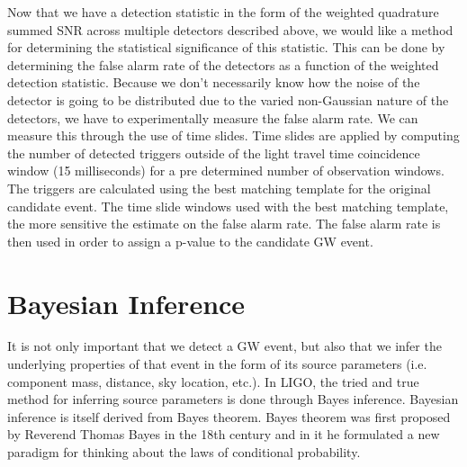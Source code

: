 %
Now that we have a detection statistic in the form of the weighted quadrature summed \ac{SNR} across multiple detectors described above, we would like a method for determining the statistical significance of this statistic. This can be done by determining the false alarm rate of the detectors as a function of the weighted detection statistic. Because we don't necessarily know how the noise of the detector is going to be distributed due to the varied non-Gaussian nature of the detectors, we have to experimentally measure the false alarm rate. We can measure this through the use of time slides. Time slides are applied by computing the number of detected triggers outside of the light travel time coincidence window (15 milliseconds) for a pre determined number of observation windows. The triggers are calculated using the best matching template for the original candidate event. The time slide windows used with the best matching template, the more sensitive the estimate on the false alarm rate. The false alarm rate is then used in order to assign a p-value to the candidate \ac{GW} event.

\section{Bayesian Inference}

%
%

%
%
It is not only important that we detect a \ac{GW} event, but also that we infer the underlying properties of that event in the form of its source parameters (i.e. component mass, distance, sky location, etc.). In \ac{LIGO}, the tried and true method for inferring source parameters is done through Bayes inference. Bayesian inference is itself derived from Bayes theorem. Bayes theorem was first proposed by Reverend Thomas Bayes in the 18th century and in it he formulated a new paradigm for thinking about the laws of conditional probability. 

